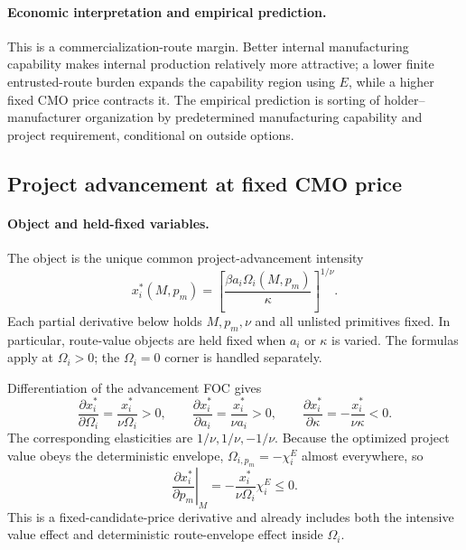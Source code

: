 \paragraph{Economic interpretation and empirical prediction.}
This is a commercialization-route margin. Better internal manufacturing
capability makes internal production relatively more attractive; a lower
finite entrusted-route burden expands the capability region using \(E\), while
a higher fixed CMO price contracts it. The empirical prediction is sorting of
holder--manufacturer organization by predetermined manufacturing capability
and project requirement, conditional on outside options.

\subsection{Project advancement at fixed CMO price}
\label{subsec:p15-advancement-fixed-price}

\paragraph{Object and held-fixed variables.}
The object is the unique common project-advancement intensity
\[
  x_i^*(M,p_m)
  =
  \left[\frac{\beta a_i\Omega_i(M,p_m)}{\kappa}\right]^{1/\nu}.
\]
Each partial derivative below holds \(M,p_m,\nu\) and all unlisted primitives
fixed. In particular, route-value objects are held fixed when \(a_i\) or
\(\kappa\) is varied. The formulas apply at \(\Omega_i>0\); the
\(\Omega_i=0\) corner is handled separately.

Differentiation of the advancement FOC gives
\begin{equation}
  \frac{\partial x_i^*}{\partial\Omega_i}
  =
  \frac{x_i^*}{\nu\Omega_i}>0,
  \qquad
  \frac{\partial x_i^*}{\partial a_i}
  =
  \frac{x_i^*}{\nu a_i}>0,
  \qquad
  \frac{\partial x_i^*}{\partial\kappa}
  =
  -\frac{x_i^*}{\nu\kappa}<0.
  \label{eq:p15-advancement-partials}
\end{equation}
The corresponding elasticities are \(1/\nu,1/\nu,-1/\nu\).
Because the optimized project value obeys the deterministic envelope,
\(\Omega_{i,p_m}=-\chi_i^E\) almost everywhere, so
\begin{equation}
  \left.\frac{\partial x_i^*}{\partial p_m}\right|_M
  =
  -\frac{x_i^*}{\nu\Omega_i}\chi_i^E
  \leq0.
  \label{eq:p15-advancement-price}
\end{equation}
This is a fixed-candidate-price derivative and already includes both the
intensive value effect and deterministic route-envelope effect inside
\(\Omega_i\).

